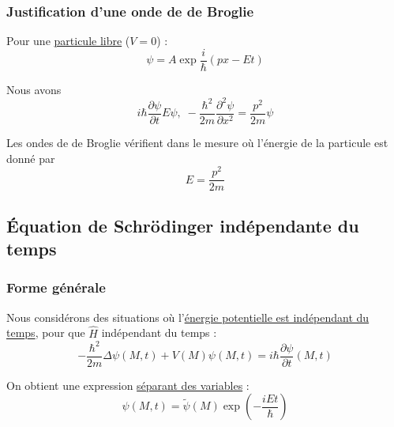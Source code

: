 \subsubsection{Justification d'une onde de de Broglie} %
\label{sub:Justification d'une onde de de Broglie}
Pour une \underline{particule libre} ($V=0$) : 
\begin{equation}
  \psi = A \exp \frac{i}{\hbar}  (p x -Et)
\end{equation}

Nous avons 
\begin{equation}
  i \hbar \frac{\partial \psi}{\partial t} E \psi, \; - \frac{\hbar ^{2}}{2m} \frac{\partial ^{2}\psi}{\partial x ^{2}}  = \frac{p ^{2}}{2m}  \psi
\end{equation}

Les ondes de de Broglie vérifient dans le mesure où l'énergie de la particule est donné par
\begin{equation}
  E = \frac{p ^{2}}{2m} 
\end{equation}




\subsection{Équation de Schrödinger indépendante du temps} %
\label{sec:Équation de Schrödinger indépendante du temps}


\subsubsection{Forme générale} %
\label{sub:Forme générale}

Nous considérons des situations où l'\underline{énergie potentielle est indépendant du temps}, pour que $\hat{H}$ indépendant du temps : 
\begin{equation}
  - \frac{\hbar ^{2}}{2m}  \Delta \psi(M,t) + V(M) \psi(M,t) = i\hbar \frac{\partial \psi}{\partial t} (M,t)
\end{equation}

On obtient une expression \underline{séparant des variables} : 
\begin{equation}
  \psi(M,t) = \widetilde{\psi}(M) \exp \left( - \frac{iEt}{\hbar}  \right)
\end{equation}

